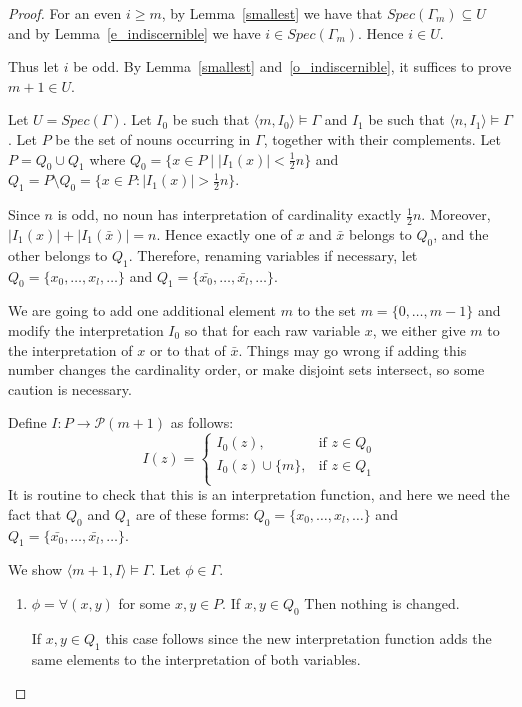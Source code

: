 \documentclass[10pt,a4paper]{amsart}
\begin{document}
\begin{proof}
	For an even $i\geq m$, by Lemma~\ref{smallest} we have that $Spec(\Gamma_m)\subseteq U$ and by Lemma~\ref{e_indiscernible} we have $i\in Spec(\Gamma_m).$ Hence $i\in U$.
	
	Thus let $i$ be odd. By Lemma~\ref{smallest} and~\ref{o_indiscernible}, it suffices to prove $m +1 \in U$. 
	
	Let $U = Spec(\Gamma)$. Let $I_0$ be such that $\langle m, I_0\rangle \models \Gamma$ and $I_1$ be such that $\langle n, I_1\rangle \models \Gamma$. Let $P$ be the set of nouns occurring in $\Gamma$, together with their complements. Let $P = Q_0 \cup Q_1$ where $Q_0 = \{x \in P \mid |I_1(x)| < \frac{1}{2}n\}$ and $Q_1 = P \setminus Q_0 = \{x\in P:|I_1(x)|> \frac{1}{2}n\}$. 
	
	Since $n$ is odd, no noun has interpretation of cardinality exactly $\frac{1}{2}n$. Moreover, $|I_1(x)|+|I_1(\bar x)|=n.$ Hence exactly one of $x$ and $\bar x$ belongs to $Q_0$, and the other belongs to $Q_1$. Therefore, renaming variables if necessary, let $Q_0 = \{x_0, \dots, x_l, \dots\}$ and $Q_1 = \{\bar{x_0}, \dots, \bar{x_l}, \dots\}$. 
	
	We are going to add one additional element $m$ to the set $m = \{0, \dots, m-1\}$ and modify the interpretation $I_0$ so that for each raw variable $x$, we either give $m$ to the interpretation of $x$ or to that of $\bar{x}$. Things may go wrong if adding this number changes the cardinality order, or make disjoint sets intersect, so some caution is necessary. 
	
	Define $I: P \to \mathcal{P}(m+1)$ as follows: 
	\[
	I(z) = 
	\begin{cases}
    	 I_0(z),& \mbox{if } z \in Q_0 \\
    	I_0(z) \cup \{m\},              & \mbox{if } z \in Q_1 \\
	\end{cases}
	\]
	It is routine to check that this is an interpretation function, and here we need the fact that $Q_0$ and $Q_1$ are of these forms: $Q_0 = \{x_0, \dots, x_l, \dots\}$ and $Q_1 = \{\bar{x_0}, \dots, \bar{x_l}, \dots\}$. 
	
	We show $\langle m+1, I\rangle \models \Gamma$. Let $\phi \in \Gamma$.	
	\begin{enumerate} 
 		 \item $\phi = \forall(x, y)$ for some $x, y \in P$. 
		 If $x, y \in Q_0$ Then nothing is changed. 	
		 	 
		 If $x, y \in Q_1$ this case follows since the new interpretation function adds the same elements to the interpretation of both variables.		 
		 

\end{enumerate}
\end{proof}
\end{document}

